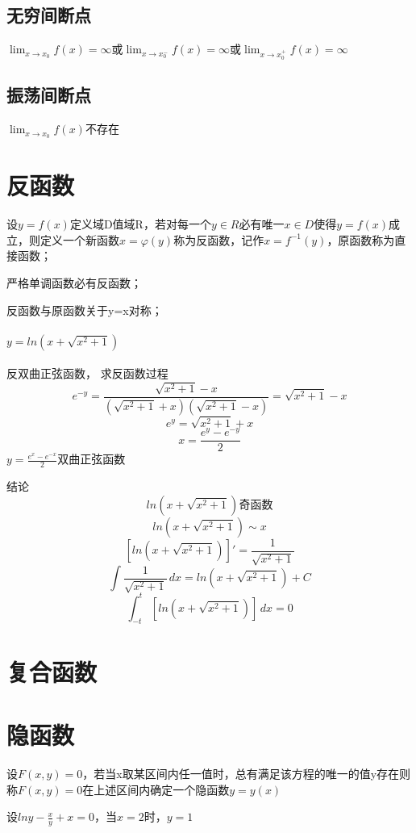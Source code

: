 \subsection{无穷间断点}
\(\displaystyle \lim_{x \to x_0}f(x) = \infty\)或\(\displaystyle \lim_{x \to x_0^-}f(x) = \infty\)或\(\displaystyle \lim_{x \to x_0^+}f(x) = \infty\)

\subsection{振荡间断点}
\(\displaystyle \lim_{x \to x_0}f(x)\)不存在


\section{反函数}
设\(y = f(x)\)定义域D值域R，若对每一个\(y \in R\)必有唯一\(x \in D\)使得\(y = f(x)\)成立，则定义一个新函数\(x = \varphi(y)\)称为反函数，记作\(x = f^{-1}(y)\)，原函数称为直接函数；

严格单调函数必有反函数；

反函数与原函数关于y=x对称；

\paragraph{\(y = ln(x + \sqrt{x^2 + 1})\)}
反双曲正弦函数，
求反函数过程
\[e^{-y} = \frac{\sqrt{x^2 + 1} - x}{(\sqrt{x^2 + 1} + x)(\sqrt{x^2 + 1} - x)} = \sqrt{x^2 + 1} - x\]
\[e^y = \sqrt{x^2 + 1} + x\]
\[x = \frac{e^y - e^{-y}}{2}\]
\(y = \frac{e^x - e^{-x}}{2}\)双曲正弦函数

结论
\[ln(x + \sqrt{x^2 + 1})\text{奇函数}\]
\[ln(x + \sqrt{x^2 + 1}) \sim x\]
\[[ln(x + \sqrt{x^2 + 1})]' = \frac{1}{\sqrt{x^2 + 1}}\]
\[\int \frac{1}{\sqrt{x^2 + 1}}\,dx = ln(x + \sqrt{x^2 + 1}) + C\]
\[\int_{-t}^{t} [ln(x + \sqrt{x^2 + 1})] \,dx = 0\]


\section{复合函数}


\section{隐函数}
设\(F(x, y) = 0\)，若当x取某区间内任一值时，总有满足该方程的唯一的值y存在则称\(F(x, y) = 0\)在上述区间内确定一个隐函数\(y = y(x)\)

设\(lny - \frac{x}{y} + x = 0\)，当\(x = 2\)时，\(y = 1\)


